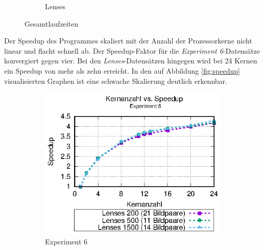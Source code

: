 \begin{center}
\begin{figure}
\begin{subfigure}[b]{0.49\textwidth}
			\caption[Lenses]{Lenses}
			\label{fig:times_lenses}
		\end{subfigure}
		\caption{Gesamtlaufzeiten}
		\label{fig:gesamtlaufzeiten}
	\end{figure}
\end{center}

Der Speedup des Programmes skaliert mit der Anzahl der Prozessorkerne nicht linear und flacht schnell ab. Der Speedup-Faktor für die \textit{Experiment 6}-Datensätze konvergiert gegen vier. Bei den \textit{Lenses}-Da\-ten\-sä\-tzen hingegen wird bei 24 Kernen ein Speedup von mehr als zehn erreicht. In den auf Abbildung \ref{fig:speedup} visualisierten Graphen ist eine schwache Skalierung deutlich erkennbar. 

\begin{center}
	\begin{figure}
		\begin{subfigure}[b]{0.49\textwidth}
			\centering
			\includegraphics[width=\textwidth]{pdf/speedup_exp6}
			\caption[Experiment 6]{Experiment 6}
			\label{fig:speedup_exp6}
		\end{subfigure}
		\hfill
		\begin{subfigure}[b]{0.49\textwidth}
			\centering

\end{subfigure}
\end{figure}
\end{center}
